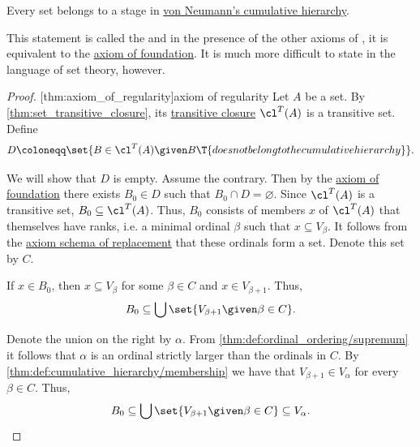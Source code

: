 \begin{theorem}\label{thm:axiom_of_regularity}
  Every set belongs to a stage in \hyperref[def:cumulative_hierarchy]{von Neumann's cumulative hierarchy}.
\end{theorem}
\begin{comments}
  \item This statement is called the  and in the presence of the other axioms of , it is equivalent to the \hyperref[def:zfc/foundation]{axiom of foundation}. It is much more difficult to state in the language of set theory, however.
\end{comments}
\begin{proof}
  [thm:axiom_of_regularity]{axiom of regularity} Let \( A \) be a set. By \cref{thm:set_transitive_closure}, its \hyperref[def:set_transitive_closure]{transitive closure} \( \cl^T(A) \) is a transitive set. Define
  \begin{equation*}
    D \coloneqq \set{ B \in \cl^T(A) \given B \T{does not belong to the cumulative hierarchy} }.
  \end{equation*}

  We will show that \( D \) is empty. Assume the contrary. Then by the \hyperref[def:zfc/foundation]{axiom of foundation} there exists \( B_0 \in D \) such that \( B_0 \cap D = \varnothing \). Since \( \cl^T(A) \) is a transitive set, \( B_0 \subseteq \cl^T(A) \). Thus, \( B_0 \) consists of members \( x \) of \( \cl^T(A) \) that themselves have ranks, i.e. a minimal ordinal \( \beta \) such that \( x \subseteq V_\beta \). It follows from the \hyperref[def:zfc/replacement]{axiom schema of replacement} that these ordinals form a set. Denote this set by \( C \).

  If \( x \in B_0 \), then \( x \subseteq V_\beta \) for some \( \beta \in C \) and \( x \in V_{\beta + 1} \). Thus,
  \begin{equation*}
    B_0 \subseteq \bigcup\set{ V_{\beta + 1} \given \beta \in C }.
  \end{equation*}


  Denote the union on the right by \( \alpha \). From \cref{thm:def:ordinal_ordering/supremum} it follows that \( \alpha \) is an ordinal strictly larger than the ordinals in \( C \). By \cref{thm:def:cumulative_hierarchy/membership} we have that \( V_{\beta + 1} \in V_\alpha \) for every \( \beta \in C \). Thus,
  \begin{equation*}
    B_0 \subseteq \bigcup\set{ V_{\beta + 1} \given \beta \in C } \subseteq V_\alpha.
  \end{equation*}


\end{proof}
